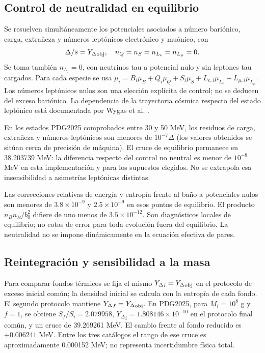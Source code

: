 \documentclass[10pt,twocolumn,a4paper]{article}
\newcommand{\Y}{{Y_\Delta}}
\newcommand{\sbar}{\bar s}
\begin{document}
\subsection{Control de neutralidad en equilibrio}
Se resuelven simultáneamente los potenciales asociados a número bariónico, carga, extrañeza y números leptónicos electrónico y muónico, con
\begin{equation}
\Delta/\sbar=\Y_{\rm obj},\quad n_Q=n_S=n_{L_e}=n_{L_\mu}=0.
\end{equation}
Se toma también $n_{L_\tau}=0$, con neutrinos tau a potencial nulo y sin leptones tau cargados. Para cada especie se usa $\mu_i=B_i\mu_B+Q_i\mu_Q+S_i\mu_S+L_{e,i}\mu_{L_e}+L_{\mu,i}\mu_{L_\mu}$. Los números leptónicos nulos son una elección explícita de control; no se deducen del exceso bariónico. La dependencia de la trayectoria cósmica respecto del estado leptónico está documentada por Wygas et al. \cite{wygas}.

En los estados PDG2025 comprobados entre 30 y 50 MeV, los residuos de carga, extrañeza y números leptónicos son menores de $10^{-7}\Delta$ (los valores obtenidos se sitúan cerca de precisión de máquina). El cruce de equilibrio permanece en 38.203739 MeV: la diferencia respecto del control no neutral es menor de $10^{-8}$ MeV en esta implementación y para los supuestos elegidos. No se extrapola esa insensibilidad a asimetrías leptónicas distintas.

Las correcciones relativas de energía y entropía frente al baño a potenciales nulos son menores de $3.8\times10^{-9}$ y $2.5\times10^{-9}$ en esos puntos de equilibrio. El producto $n_B n_{\bar B}/b_0^2$ difiere de uno menos de $3.5\times10^{-12}$. Son diagnósticos locales de equilibrio; no cotas de error para toda evolución fuera del equilibrio. La neutralidad no se impone dinámicamente en la ecuación efectiva de pares.

\subsection{Reintegración y sensibilidad a la masa}
Para comparar fondos térmicos se fija el mismo $\Y_i=\Y_{\rm obj}$ en el protocolo de exceso inicial común; la densidad inicial se calcula con la entropía de cada fondo. El segundo protocolo mantiene $\Y_f=\Y_{\rm obj}$. En PDG2025, para $M_i=10^8$ g y $f=1$, se obtiene $S_f/S_i=2.079958$, $\Y_i=1.808146\times10^{-10}$ en el protocolo final común, y un cruce de 39.269261 MeV. El cambio frente al fondo reducido es $+0.006241$ MeV. Entre los tres catálogos el rango de ese cruce es aproximadamente 0.000152 MeV; no representa incertidumbre física total.
\end{document}

